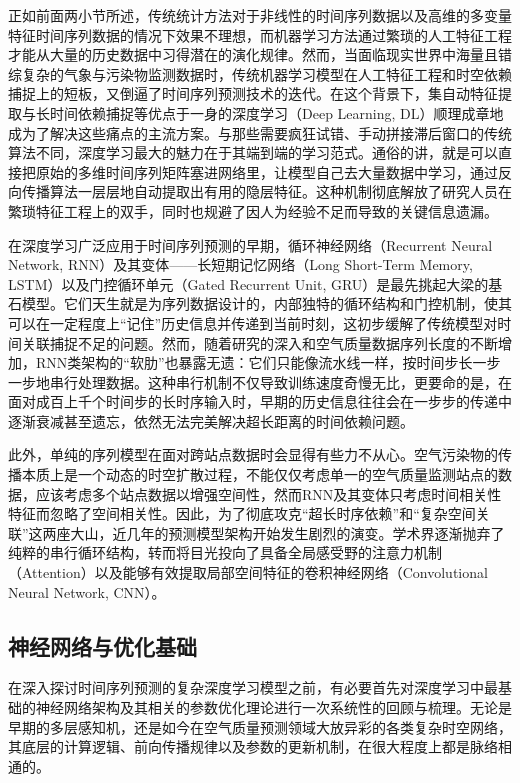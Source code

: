 正如前面两小节所述，传统统计方法对于非线性的时间序列数据以及高维的多变量特征时间序列数据的情况下效果不理想，而机器学习方法通过繁琐的人工特征工程才能从大量的历史数据中习得潜在的演化规律。然而，当面临现实世界中海量且错综复杂的气象与污染物监测数据时，传统机器学习模型在人工特征工程和时空依赖捕捉上的短板，又倒逼了时间序列预测技术的迭代。在这个背景下，集自动特征提取与长时间依赖捕捉等优点于一身的深度学习（Deep Learning, DL）顺理成章地成为了解决这些痛点的主流方案。与那些需要疯狂试错、手动拼接滞后窗口的传统算法不同，深度学习最大的魅力在于其端到端的学习范式。通俗的讲，就是可以直接把原始的多维时间序列矩阵塞进网络里，让模型自己去大量数据中学习，通过反向传播算法一层层地自动提取出有用的隐层特征。这种机制彻底解放了研究人员在繁琐特征工程上的双手，同时也规避了因人为经验不足而导致的关键信息遗漏。

在深度学习广泛应用于时间序列预测的早期，循环神经网络（Recurrent Neural Network, RNN）及其变体——长短期记忆网络（Long Short-Term Memory, LSTM）以及门控循环单元（Gated Recurrent Unit, GRU）是最先挑起大梁的基石模型。它们天生就是为序列数据设计的，内部独特的循环结构和门控机制，使其可以在一定程度上“记住”历史信息并传递到当前时刻，这初步缓解了传统模型对时间关联捕捉不足的问题。然而，随着研究的深入和空气质量数据序列长度的不断增加，RNN类架构的“软肋”也暴露无遗：它们只能像流水线一样，按时间步长一步一步地串行处理数据。这种串行机制不仅导致训练速度奇慢无比，更要命的是，在面对成百上千个时间步的长时序输入时，早期的历史信息往往会在一步步的传递中逐渐衰减甚至遗忘，依然无法完美解决超长距离的时间依赖问题。

此外，单纯的序列模型在面对跨站点数据时会显得有些力不从心。空气污染物的传播本质上是一个动态的时空扩散过程，不能仅仅考虑单一的空气质量监测站点的数据，应该考虑多个站点数据以增强空间性，然而RNN及其变体只考虑时间相关性特征而忽略了空间相关性。因此，为了彻底攻克“超长时序依赖”和“复杂空间关联”这两座大山，近几年的预测模型架构开始发生剧烈的演变。学术界逐渐抛弃了纯粹的串行循环结构，转而将目光投向了具备全局感受野的注意力机制（Attention）以及能够有效提取局部空间特征的卷积神经网络（Convolutional Neural Network, CNN）。

\subsection{神经网络与优化基础}

在深入探讨时间序列预测的复杂深度学习模型之前，有必要首先对深度学习中最基础的神经网络架构及其相关的参数优化理论进行一次系统性的回顾与梳理。无论是早期的多层感知机，还是如今在空气质量预测领域大放异彩的各类复杂时空网络，其底层的计算逻辑、前向传播规律以及参数的更新机制，在很大程度上都是脉络相通的。

